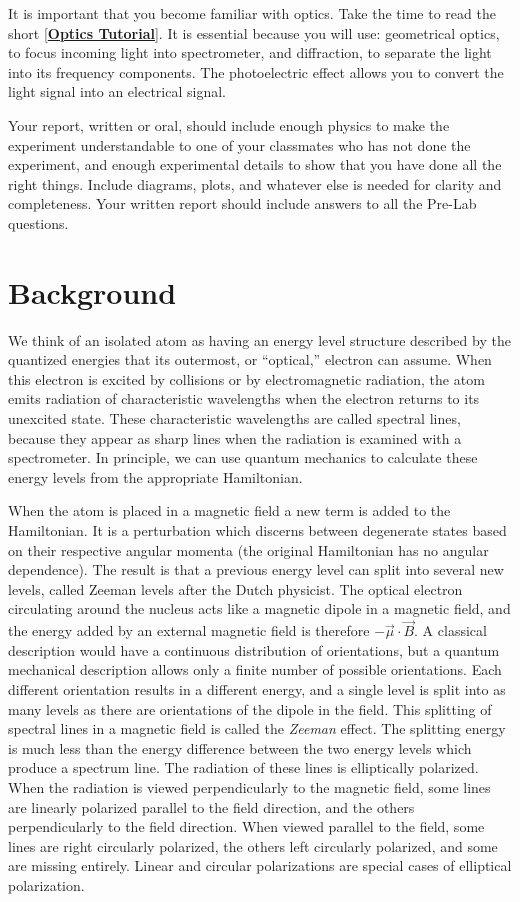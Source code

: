 \documentclass{../lab}
\begin{document}
It is important that you become familiar with optics. Take the time to read the short [\href{http://experimentationlab.berkeley.edu/OpticsTutorial}{\textbf{Optics Tutorial}}]. It is essential because you will use: geometrical optics, to focus incoming light into spectrometer, and diffraction, to separate the light into its frequency components. The photoelectric effect allows you to convert the light signal into an electrical signal.

Your report, written or oral, should include enough physics to make the experiment understandable to one of your classmates who has not done the experiment, and enough experimental details to show that you have done all the right things. Include diagrams, plots, and whatever else is needed for clarity and completeness. Your written report should include answers to all the Pre-Lab questions.

\section{Background}

We think of an isolated atom as having an energy level structure described by the quantized energies that its outermost, or ``optical,'' electron can assume. When this electron is excited by collisions or by electromagnetic radiation, the atom emits radiation of characteristic wavelengths when the electron returns to its unexcited state. These characteristic wavelengths are called spectral lines, because they appear as sharp lines when the radiation is examined with a spectrometer. In principle, we can use quantum mechanics to calculate these energy levels from the appropriate Hamiltonian.

When the atom is placed in a magnetic field a new term is added to the Hamiltonian. It is a perturbation which discerns between degenerate states based on their respective angular momenta (the original Hamiltonian has no angular dependence). The result is that a previous energy level can split into several new levels, called Zeeman levels after the Dutch physicist. The optical electron circulating around the nucleus acts like a magnetic dipole in a magnetic field, and the energy added by an external magnetic field is therefore $-\vec \mu \cdot\vec B$. A classical description would have a continuous distribution of orientations, but a quantum mechanical description allows only a finite number of possible orientations. Each different orientation results in a different energy, and a single level is split into as many levels as there are orientations of the dipole in the field. This splitting of spectral lines in a magnetic field is called the \emph{Zeeman} effect. The splitting energy is much less than the energy difference between the two energy levels which produce a spectrum line. The radiation of these lines is elliptically polarized. When the radiation is viewed perpendicularly to the magnetic field, some lines are linearly polarized parallel to the field direction, and the others perpendicularly to the field direction. When viewed parallel to the field, some lines are right circularly polarized, the others left circularly polarized, and some are missing entirely. Linear and circular polarizations are special cases of elliptical polarization.
\end{document}
